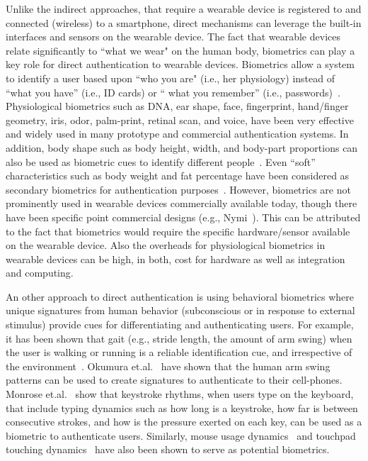 Unlike the indirect approaches, that require a wearable device is registered to
and connected (wireless) to a smartphone, direct
mechanisms can leverage the built-in interfaces and sensors on the
wearable device. The fact that wearable devices relate significantly to ``what we wear" on the
human body, biometrics can play a key role for direct authentication to wearable
devices. Biometrics allow a system to identify a user based upon ``who you
are" (i.e., her physiology) instead of ``what you
have'' (i.e., ID cards) or `` what you remember'' (i.e.,
passwords)~\cite{jain2004introduction,o2003comparing,yampolskiy2007motor}.
Physiological biometrics such as DNA, ear shape, face, fingerprint,
hand/finger geometry,
iris, odor, palm-print, retinal scan, and voice, have been very effective and
widely used in many prototype and commercial authentication systems.
In addition, body shape such as body height, width, and body-part proportions
can also be used as biometric cues to identify different
people~\cite{collins2002silhouette}. Even ``soft'' characteristics such as
body weight and fat percentage have been considered as secondary biometrics
for authentication purposes~\cite{ailisto2006soft}. However, biometrics are
not prominently used in wearable devices commercially available today, though
there have been specific point commercial designs (e.g., Nymi~\cite{nymi}). This can be attributed to the
fact that biometrics would require the specific hardware/sensor available on
the wearable device. Also the overheads for physiological biometrics in
wearable devices can be high, in both, cost for hardware as well as
integration and computing.

An other approach to direct authentication is using behavioral biometrics
where unique signatures from human behavior (subconscious
or in response to external stimulus) provide cues for differentiating and
authenticating users. For example, it has been shown that gait (e.g.,
stride length, the
amount of arm swing) when the user is walking or
running is a reliable identification cue, and irrespective of the
environment~\cite{stevenage1999visual}. Okumura et.al.~\cite{okumura2006study}
have shown that the human arm swing patterns can be used to create signatures
to authenticate to their cell-phones. Monrose
et.al.~\cite{monrose2000keystroke} show that keystroke rhythms, when
users type on the keyboard, that include typing dynamics such as how
long is a keystroke, how far is between consecutive strokes, and how is the
pressure exerted on each key, can be used as a biometric to authenticate
users. Similarly, mouse usage dynamics~\cite{jorgensen2011mouse} and touchpad
touching dynamics~\cite{bo2013silentsense,de2012touch} have also been shown to
serve as potential biometrics.

